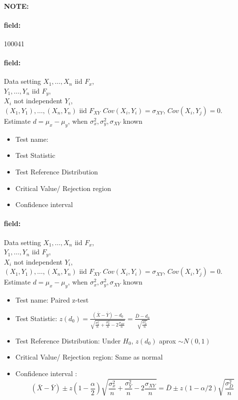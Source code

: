\documentclass[12pt]{article}
\newenvironment{note}{\paragraph{NOTE:}}{}
\newenvironment{field}{\paragraph{field:}}{}
\begin{document}
\begin{note} \begin{field} \tiny 100041 \end{field}
 \begin{field}
  Data setting $X_1, \ldots , X_n$ iid $F_x$,\\
  $Y_1, \ldots, Y_n$ iid $F_y$,\\
  $X_i$ not independent $Y_i$,\\
  $(X_1, Y_1), \ldots , (X_n,Y_n)$ iid $F_{XY}$ $Cov(X_i,Y_i) = \sigma_{XY}$, $Cov(X_i,Y_j) = 0$. \\
  Estimate $d = \mu_x - \mu_y$, when $\sigma_x^2, \sigma_y^2, \sigma_{XY}$ known
  \begin{itemize}
   \item Test name:
   \item Test Statistic
   \item Test Reference Distribution
   \item Critical Value/ Rejection region
   \item Confidence interval
  \end{itemize}
 \end{field}
 \begin{field}
  Data setting $X_1, \ldots , X_n$ iid $F_x$,\\
  $Y_1, \ldots, Y_n$ iid $F_y$,\\
  $X_i$ not independent $Y_i$,\\
  $(X_1, Y_1), \ldots , (X_n,Y_n)$ iid $F_{XY}$ $Cov(X_i,Y_i) = \sigma_{XY}$, $Cov(X_i,Y_j) = 0$. \\
  Estimate $d = \mu_x - \mu_y$, when $\sigma_x^2, \sigma_y^2, \sigma_{XY}$ known
  \begin{itemize}
   \item Test name: Paired z-test
   \item Test Statistic: $z(d_0) = \frac{(\bar{X} - \bar{Y}) - d_0}{\sqrt{\frac{\sigma_x^2}{n} + \frac{\sigma_Y^2}{n} - 2 \frac{\sigma_{XY}}{n}}} = \frac{\bar{D} - d_0}{\sqrt{\frac{\sigma_D^2}{n}}}$
   \item Test Reference Distribution: Under $H_0$, $z(d_0) $ aprox $\sim N(0,1)$
   \item Critical Value/ Rejection region: Same as normal
   \item Confidence interval : $$(\bar{X} - \bar{Y}) \pm z(1 - \frac{\alpha}{2})\sqrt{\frac{\sigma_x^2}{n} + \frac{\sigma_Y^2}{n} - 2 \frac{\sigma_{XY}}{n}} = \bar{D} \pm z(1 - \alpha/2) \sqrt{\frac{\sigma_D^2}{n}}$$
  \end{itemize}
 \end{field}
\end{note}
\end{document}
